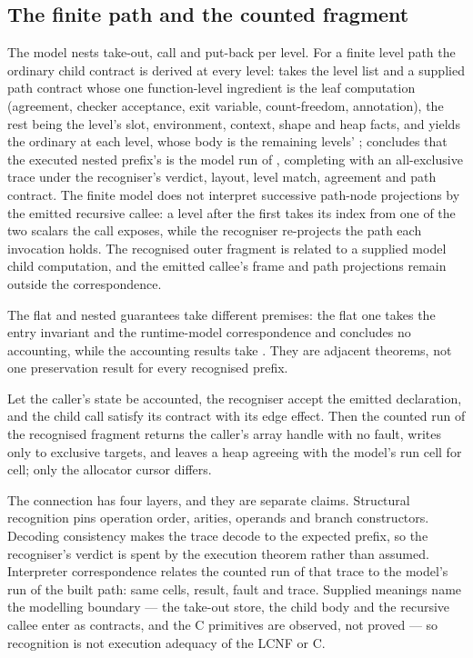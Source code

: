 \documentclass[a4paper,UKenglish,cleveref]{lipics-v2021}
\begin{document}
\subsection{The finite path and the counted fragment}
The model nests take-out, call and put-back per level. For a finite level path the
ordinary child contract is derived at every level: 
takes the level list and a supplied path contract whose one function-level
ingredient is the leaf computation (agreement, checker acceptance, exit variable,
count-freedom, annotation), the rest being the level's slot, environment, context,
shape and heap facts, and yields the ordinary
 at each level, whose body is the remaining levels'
;  concludes that the executed
nested prefix's  is the model run of
, completing with an all-exclusive
trace under the recogniser's verdict, layout, level match, agreement and path
contract. The finite model does not interpret successive path-node projections by
the emitted recursive callee: a level after the first takes its index from one of
the two scalars the call exposes, while the recogniser re-projects the path each
invocation holds. The recognised outer fragment is related to a supplied model
child computation, and the emitted callee's frame and path projections remain
outside the correspondence.

The flat and nested guarantees take different premises: the flat one takes the
entry invariant and the runtime-model correspondence and concludes no accounting,
while the accounting results take . They are adjacent theorems,
not one preservation result for every recognised prefix.

\begin{claim}[in words]\label{claim:inwords}
Let the caller's state be accounted, the recogniser accept the emitted declaration,
and the child call satisfy its contract with its edge effect. Then the counted run
of the recognised fragment returns the caller's array handle with no fault, writes
only to exclusive targets, and leaves a heap agreeing with the model's run cell for
cell; only the allocator cursor differs.
\end{claim}

The connection has four layers, and they are separate claims. Structural
recognition pins operation order, arities, operands and branch constructors. Decoding consistency makes the
trace decode to the expected prefix, so the recogniser's verdict is spent by the
execution theorem rather than assumed. Interpreter
correspondence relates the counted run of that trace to the model's run of the
built path: same cells, result, fault and trace. Supplied meanings name the
modelling boundary --- the take-out store, the child body and the recursive callee
enter as contracts, and the C primitives are observed, not proved --- so recognition
is not execution adequacy of the LCNF or C.
\end{document}
